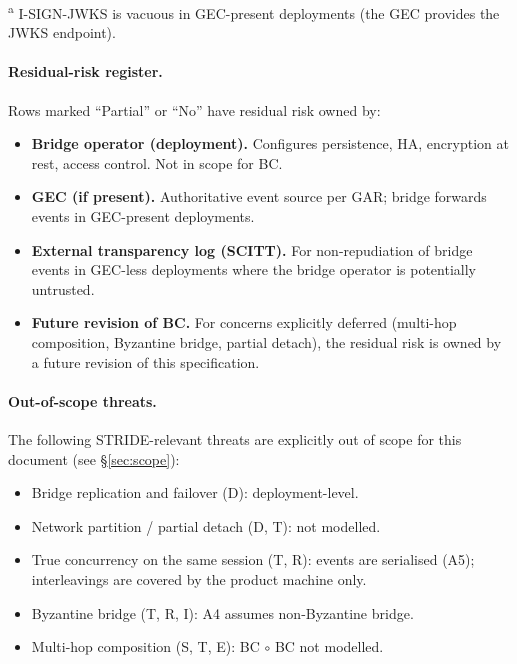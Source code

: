 \noindent\textsuperscript{a} I-SIGN-JWKS is vacuous in GEC-present deployments (the GEC provides the JWKS endpoint).

\paragraph{Residual-risk register.} Rows marked ``Partial'' or
``No'' have residual risk owned by:
\begin{itemize}[leftmargin=2em]
\item \textbf{Bridge operator (deployment).} Configures
persistence, HA, encryption at rest, access control. Not in scope
for BC.
\item \textbf{GEC (if present).} Authoritative event source per
GAR; bridge forwards events in GEC-present deployments.
\item \textbf{External transparency log (SCITT).} For
non-repudiation of bridge events in GEC-less deployments where
the bridge operator is potentially untrusted.
\item \textbf{Future revision of BC.} For concerns explicitly
deferred (multi-hop composition, Byzantine bridge, partial
detach), the residual risk is owned by a future revision of this
specification.
\end{itemize}

\paragraph{Out-of-scope threats.} The following STRIDE-relevant
threats are explicitly out of scope for this document (see
\S\ref{sec:scope}):
\begin{itemize}[leftmargin=2em]
\item Bridge replication and failover (D): deployment-level.
\item Network partition / partial detach (D, T): not modelled.
\item True concurrency on the same session (T, R): events are
serialised (A5); interleavings are covered by the product machine only.
\item Byzantine bridge (T, R, I): A4 assumes non-Byzantine bridge.
\item Multi-hop composition (S, T, E): BC $\circ$ BC not modelled.
\end{itemize}

